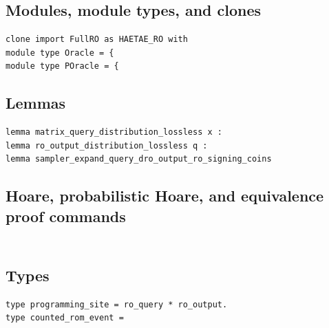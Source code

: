 \subsection*{Modules, module types, and clones}
\begin{lstlisting}[language=EasyCrypt,basicstyle=\ttfamily\tiny]
clone import FullRO as HAETAE_RO with
module type Oracle = {
module type POracle = {
\end{lstlisting}

\subsection*{Lemmas}
\begin{lstlisting}[language=EasyCrypt,basicstyle=\ttfamily\tiny]
lemma matrix_query_distribution_lossless x :
lemma ro_output_distribution_lossless q :
lemma sampler_expand_query_dro_output_ro_signing_coins
\end{lstlisting}

\subsection*{Hoare, probabilistic Hoare, and equivalence proof commands}
\begin{lstlisting}[language=EasyCrypt,basicstyle=\ttfamily\tiny]
\end{lstlisting}

\section*{}

\subsection*{Types}
\begin{lstlisting}[language=EasyCrypt,basicstyle=\ttfamily\tiny]
type programming_site = ro_query * ro_output.
type counted_rom_event =
\end{lstlisting}

